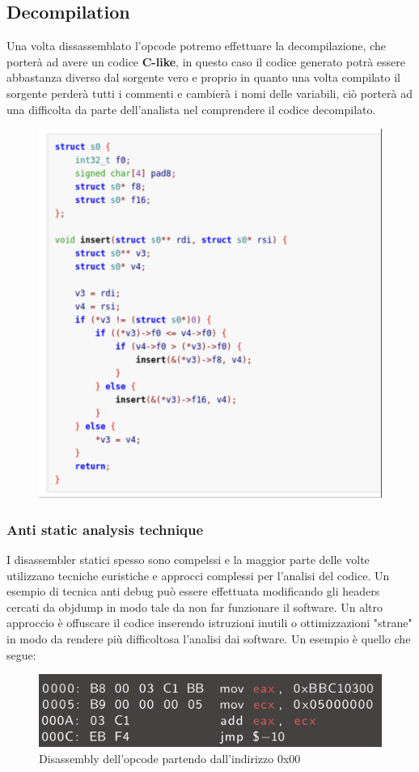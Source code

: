 \subsection{Decompilation}
Una volta dissassemblato l'opcode potremo effettuare la decompilazione, che porterà ad avere un codice \textbf{C-like}, in questo caso il codice generato potrà essere abbastanza diverso dal sorgente vero e proprio in quanto una volta compilato il sorgente perderà tutti i commenti e cambierà i nomi delle variabili, ciò porterà ad una difficolta da parte dell'analista nel comprendere il codice decompilato.
\begin{figure}[h!]
    \centering
    \includegraphics[width=.6\linewidth]{res/decompiled_code.png}
    \caption{}
\end{figure}

\subsubsection{Anti static analysis technique}
I disassembler statici spesso sono compelssi e la maggior parte delle volte utilizzano tecniche euristiche e approcci complessi per l'analisi del codice.
Un esempio di tecnica anti debug può essere effettuata modificando gli headers cercati da objdump in modo tale da non far funzionare il software. Un altro approccio è offuscare il codice inserendo istruzioni inutili o ottimizzazioni "strane" in modo da rendere più difficoltosa l'analisi dai software.
Un esempio è quello che segue:
\begin{figure}[h!]
    \centering
    \includegraphics[width=.6\linewidth]{res/obfuscated_code.png}
    \caption{Disassembly dell'opcode partendo dall'indirizzo 0x00}
\end{figure}

